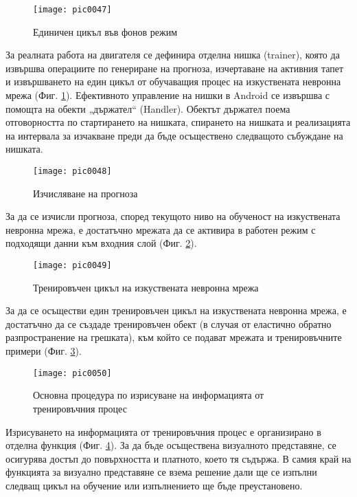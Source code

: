 \begin{figure}[h]
  \centering
  \texttt{[image: pic0047]}
  \caption{Единичен цикъл във фонов режим}
\label{fig:pic0047}
\end{figure}
\FloatBarrier

За реалната работа на двигателя се дефинира отделна нишка (trainer), която да извършва операциите по генериране на прогноза, изчертаване на активния тапет и извършването на един цикъл от обучаващия процес на изкуствената невронна мрежа (Фиг. \ref{fig:pic0047}). Ефективното управление на нишки в Android се извършва с помощта на обекти „държател“ (Handler). Обектът държател поема отговорността по стартирането на нишката, спирането на нишката и реализацията на интервала за изчакване преди да бъде осъществено следващото събуждане на нишката. 

\begin{figure}[h]
  \centering
  \texttt{[image: pic0048]}
  \caption{Изчисляване на прогноза}
\label{fig:pic0048}
\end{figure}
\FloatBarrier

За да се изчисли прогноза, според текущото ниво на обученост на изкуствената невронна мрежа, е достатъчно мрежата да се активира в работен режим с подходящи данни към входния слой (Фиг. \ref{fig:pic0048}).

\begin{figure}[h]
  \centering
  \texttt{[image: pic0049]}
  \caption{Тренировъчен цикъл на изкуствената невронна мрежа}
\label{fig:pic0049}
\end{figure}
\FloatBarrier

За да се осъществи един тренировъчен цикъл на изкуствената невронна мрежа, е достатъчно да се създаде тренировъчен обект (в случая от еластично обратно разпространение на грешката), към който се подават мрежата и тренировъчните примери (Фиг. \ref{fig:pic0049}).

\begin{figure}[h]
  \centering
  \texttt{[image: pic0050]}
  \caption{Основна процедура по изрисуване на информацията от тренировъчния процес}
\label{fig:pic0050}
\end{figure}
\FloatBarrier

Изрисуването на информацията от тренировъчния процес е организирано в отделна функция (Фиг. \ref{fig:pic0050}). За да бъде осъществена визуалното представяне, се осигурява достъп до повърхността и платното, което тя съдържа. В самия край на функцията за визуално представяне се взема решение дали ще се изпълни следващ цикъл на обучение или изпълнението ще бъде преустановено. 

